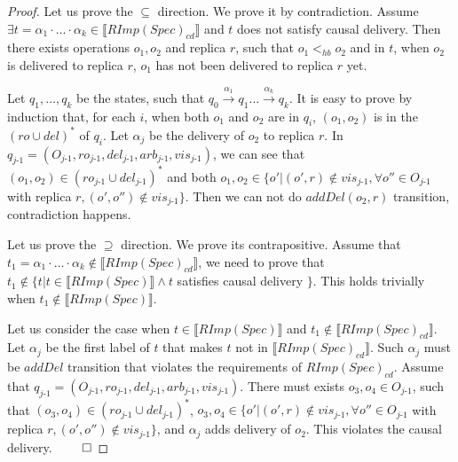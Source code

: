 \begin {proof}

Let us prove the $\subseteq$ direction. We prove it by contradiction. Assume $\exists t =\alpha_1 \cdot \ldots \cdot \alpha_k \in \llbracket RImp(Spec)_{\textit{cd}} \rrbracket$ and $t$ does not satisfy causal delivery. Then there exists operations $o_1,o_2$ and replica $r$, such that $o_1 <_{hb} o_2$ and in $t$, when $o_2$ is delivered to replica $r$, $o_1$ has not been delivered to replica $r$ yet.

Let $q_1,\ldots,q_k$ be the states, such that $q_0 {\xrightarrow{\alpha_1}} q_1 \ldots {\xrightarrow{\alpha_k}} q_k$. It is easy to prove by induction that, for each $i$, when both $o_1$ and $o_2$ are in $q_i$, $(o_1,o_2)$ is in the $(ro \cup del)^*$ of $q_i$. Let $\alpha_j$ be the delivery of $o_2$ to replica $r$. In $q_{\textit{j-1}} = (O_{\textit{j-1}},ro_{\textit{j-1}},del_{\textit{j-1}},arb_{\textit{j-1}},vis_{\textit{j-1}})$, we can see that $(o_1,o_2) \in (ro_{\textit{j-1}} \cup del_{\textit{j-1}})^*$ and both $o_1,o_2 \in \{ o' \vert (o',r) \notin vis_{\textit{j-1}}, \forall o'' \in O_{\textit{j-1}}$  with replica $r, (o',o'') \notin vis_{\textit{j-1}} \}$. Then we can not do $addDel(o_2,r)$ transition, contradiction happens.

Let us prove the $\supseteq$ direction. We prove its contrapositive. Assume that $t_1 =\alpha_1 \cdot \ldots \cdot \alpha_k \notin \llbracket RImp(Spec)_{\textit{cd}} \rrbracket$, we need to prove that $t_1 \notin \{ t \vert t \in \llbracket RImp(Spec) \rrbracket \wedge t$ satisfies causal delivery $\}$. This holds trivially when $t_1 \notin \llbracket RImp(Spec) \rrbracket$.

Let us consider the case when $t \in \llbracket RImp(Spec) \rrbracket$ and $t_1 \notin \llbracket RImp(Spec)_{\textit{cd}} \rrbracket$. Let $\alpha_j$ be the first label of $t$ that makes $t$ not in $\llbracket RImp(Spec)_{\textit{cd}} \rrbracket$. Such $\alpha_j$ must be $addDel$ transition that violates the requirements of $RImp(Spec)_{\textit{cd}}$. Assume that $q_{\textit{j-1}} = (O_{\textit{j-1}},ro_{\textit{j-1}},del_{\textit{j-1}},arb_{\textit{j-1}},vis_{\textit{j-1}})$. There must exists $o_3,o_4 \in O_{\textit{j-1}}$, such that $(o_3,o_4) \in (ro_{\textit{j-1}} \cup del_{\textit{j-1}})^*$, $o_3,o_4 \in \{ o' \vert (o',r) \notin vis_{\textit{j-1}}, \forall o'' \in O_{\textit{j-1}}$  with replica $r, (o',o'') \notin vis_{\textit{j-1}} \}$, and $\alpha_j$ adds delivery of $o_2$. This violates the causal delivery. $\qed$
\end {proof}




